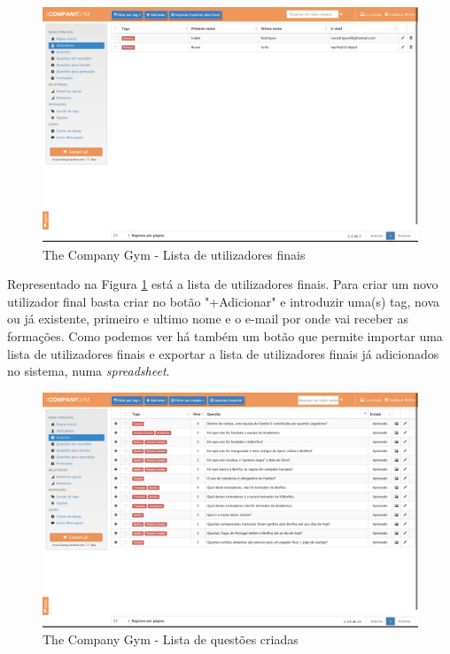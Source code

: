 \begin{figure}[ht!]
	\begin{center}
		\includegraphics[width=1\textwidth]{img/tcg/tcg-utilizadores.png}
		\caption{The Company Gym - Lista de utilizadores finais}
		\label{fig:tcg-utilizadores}
	\end{center}
\end{figure}

Representado na Figura \ref{fig:tcg-utilizadores} está a lista de utilizadores finais. Para criar um novo utilizador final basta criar no botão "+Adicionar" e introduzir uma(s) tag, nova ou já existente, primeiro e ultimo nome e o e-mail por onde vai receber as formações. Como podemos ver há também um botão que permite importar uma lista de utilizadores finais e exportar a lista de utilizadores finais já adicionados no sistema, numa \textit{spreadsheet}.
\newpage

\begin{figure}[ht!]
	\begin{center}
		\includegraphics[width=1\textwidth]{img/tcg/tcg-questoes.png}
		\caption{The Company Gym - Lista de questões criadas}
		\label{fig:tcg-questoes}
	\end{center}
\end{figure}

